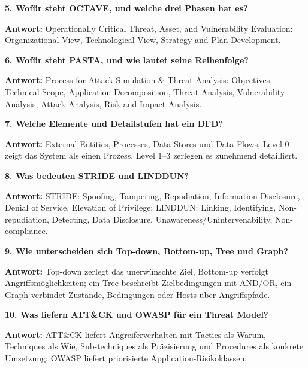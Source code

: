 \documentclass[11pt,a4paper]{article}
\newcommand{\qa}[3]{\par\vspace{4pt}\textbf{#1. #2}\par #3\par}
\begin{document}
\qa{5}{Wofür steht OCTAVE, und welche drei Phasen hat es?}
{\textbf{Antwort:} Operationally Critical Threat, Asset, and Vulnerability Evaluation: Organizational View, Technological View, Strategy and Plan Development.}

\qa{6}{Wofür steht PASTA, und wie lautet seine Reihenfolge?}
{\textbf{Antwort:} Process for Attack Simulation \& Threat Analysis: Objectives, Technical Scope, Application Decomposition, Threat Analysis, Vulnerability Analysis, Attack Analysis, Risk and Impact Analysis.}

\qa{7}{Welche Elemente und Detailstufen hat ein DFD?}
{\textbf{Antwort:} External Entities, Processes, Data Stores und Data Flows; Level 0 zeigt das System als einen Prozess, Level 1--3 zerlegen es zunehmend detailliert.}

\qa{8}{Was bedeuten STRIDE und LINDDUN?}
{\textbf{Antwort:} STRIDE: Spoofing, Tampering, Repudiation, Information Disclosure, Denial of Service, Elevation of Privilege; LINDDUN: Linking, Identifying, Non-repudiation, Detecting, Data Disclosure, Unawareness/Unintervenability, Non-compliance.}

\qa{9}{Wie unterscheiden sich Top-down, Bottom-up, Tree und Graph?}
{\textbf{Antwort:} Top-down zerlegt das unerwünschte Ziel, Bottom-up verfolgt Angriffsmöglichkeiten; ein Tree beschreibt Zielbedingungen mit AND/OR, ein Graph verbindet Zustände, Bedingungen oder Hosts über Angriffspfade.}

\qa{10}{Was liefern ATT\&CK und OWASP für ein Threat Model?}
{\textbf{Antwort:} ATT\&CK liefert Angreiferverhalten mit Tactics als Warum, Techniques als Wie, Sub-techniques als Präzisierung und Procedures als konkrete Umsetzung; OWASP liefert priorisierte Application-Risikoklassen.}
\end{document}

